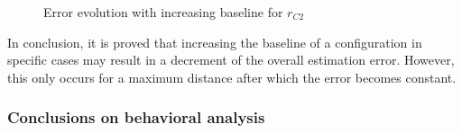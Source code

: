 \begin{figure}[!htbp]
	\captionsetup{justification=centering,margin=2cm}
	\caption{Error evolution with increasing baseline for $r_{C2}$}
	\label{fig:plot-baseline-increase-2}
\end{figure}

In conclusion, it is proved that increasing the baseline of a configuration in specific cases may result in a decrement of the overall estimation error. However, this only occurs for a maximum distance after which the error becomes constant. 


\subsubsection{ Conclusions on behavioral analysis}

